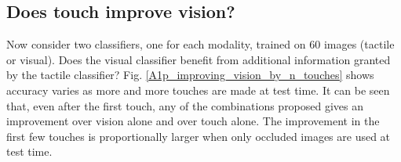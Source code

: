 \documentclass[]{article}
\begin{document}
\subsection{Does touch improve vision?}
Now consider two classifiers, one for each modality, trained on 60 images (tactile or visual). Does the visual classifier benefit from additional information granted by the tactile classifier? Fig. \ref{A1p_improving_vision_by_n_touches} shows accuracy varies as more and more touches are made at test time. It can be seen that, even after the first touch, any of the combinations proposed gives an improvement over vision alone and over touch alone. The improvement in the first few touches is proportionally larger when only occluded images are used at test time.
\begin{figure}
	\centering
	\end{figure}
	


\end{document}
